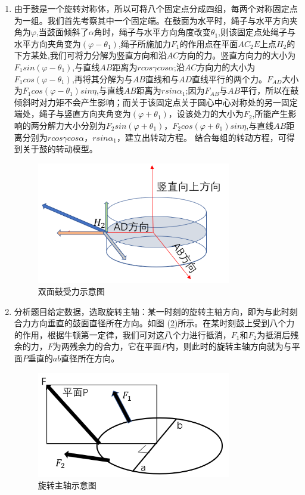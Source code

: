 \documentclass{cumcm}
\begin{document}
\begin{enumerate}
\item 由于鼓是一个旋转対称体，所以可将八个固定点分成四组，每两个对称固定点为一组。我们首先考察其中一个固定端。在鼓面为水平时，绳子与水平方向夹角为$\varphi$,当鼓面倾斜了$\alpha$角时，绳子与水平方向角度改变$\theta_1$,则该固定点处绳子与水平方向夹角变为$(\varphi-\theta_1)$,绳子所施加力$F_1$的作用点在平面$AC_2E$上点$H_2$的下方某处,我们可将力分解为竖直方向和沿$AC$方向的力。竖直方向力的大小为$F_1sin(\varphi-\theta_1)$,与直线$AB$距离为$rcos\gamma cos\alpha$;沿$AC$方向力的大小为$F_1cos(\varphi-\theta_1)$,再将其分解为与$AB$直线和与$AD$直线平行的两个力。$F_{AD}$大小为$F_1cos(\varphi-\theta_1)sin\eta$,与直线$AB$距离为$rsin\alpha_1$;因为$F_{AB}$与$AB$平行，所以在鼓倾斜时对力矩不会产生影响；而关于该固定点关于圆心中心对称处的另一固定端处，绳子与竖直方向夹角变为$(\varphi+\theta_1)$，设该处力的大小为$F_2$,所能产生影响的两分解力大小分别为$F_2sin(\varphi+\theta_1)$，$F_2cos(\varphi+\theta_1)sin\eta$,与直线$AB$距离分别为$rcos\gamma cos\alpha$，$rsin\alpha_1$，建立出转动方程。 结合每组的转动方程，可得到关于鼓的转动模型。
\begin{figure}[H]
\centering
\includegraphics[width=0.8\textwidth]{img/fight.png}
\caption{双面鼓受力示意图}\label{fig:fight}
\end{figure}
\item 分析题目给定数据，选取旋转主轴：某一时刻的旋转主轴方向，即为与此时刻合力方向垂直的鼓面直径所在方向。如图 (\ref{figmain})所示。在某时刻鼓上受到八个力的作用，根据牛顿第一定律，我们可对这八个力进行抵消，$F_1$和$F_2$为抵消后残余的力，$F$为两残余力的合力，它在平面$P$内，则此时的旋转主轴方向就为与平面$P$垂直的$ab$直径所在方向。

\begin{figure}[H]
\centering
\includegraphics[width=0.8\textwidth]{img/main.png}
\caption{旋转主轴示意图}\label{figmain}
\end{figure}


\end{enumerate}
\end{document}
